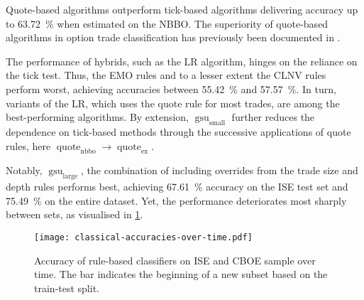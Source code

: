 Quote-based algorithms outperform tick-based algorithms delivering accuracy up to \SI{63.72}{\percent} when estimated on the \gls{NBBO}. The superiority of quote-based algorithms in option trade classification has previously been documented in \textcites[][891]{savickasInferringDirectionOption2003}[][3]{grauerOptionTradeClassification2022}.

The performance of hybrids, such as the \gls{LR} algorithm, hinges on the reliance on the tick test. Thus, the \gls{EMO} rules and to a lesser extent the \gls{CLNV} rules perform worst, achieving accuracies between \SI{55.42}{\percent} and \SI{57.57}{\percent}. In turn, variants of the \gls{LR}, which uses the quote rule for most trades, are among the best-performing algorithms. By extension, $\operatorname{gsu}_{\mathrm{small}}$ further reduces the dependence on tick-based methods through the successive applications of quote rules, here $\operatorname{quote}_{\mathrm{nbbo}} \to \operatorname{quote}_{\mathrm{ex}}$.

Notably, $\operatorname{gsu}_{\mathrm{large}}$, the combination of \textcite[][33]{grauerOptionTradeClassification2022} including overrides from the trade size and depth rules performs best, achieving \SI{67.61}{\percent} accuracy on the \gls{ISE} test set and \SI{75.49}{\percent} on the entire dataset. Yet, the performance deteriorates most sharply between sets, as visualised in \cref{fig:classical-accuracies-over-time}.

\begin{figure}[ht]
    \centering
    \texttt{[image: classical-accuracies-over-time.pdf]}
    \caption[Accuracy of Rule-Based Classifiers Over Time]{Accuracy of rule-based classifiers on \gls{ISE} and \gls{CBOE} sample over time. The bar \myline{} indicates the beginning of a new subset based on the train-test split.}
    \label{fig:classical-accuracies-over-time}
\end{figure}

